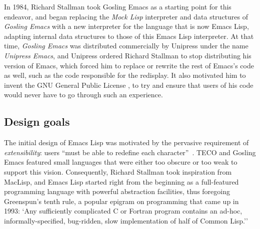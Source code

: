 \documentclass[format=acmsmall, review]{acmart}
\newcommand \Elisp {Emacs Lisp}
\begin{document}
In 1984, Richard Stallman took Gosling Emacs as a starting point for this
endeavor, and began replacing
the \emph{Mock Lisp} interpreter and data structures of \emph{Gosling Emacs}
with a new interpreter for the language that is now \Elisp{}, adapting
internal data structures to those of
this \Elisp{} interpreter.  At that time, \emph{Gosling Emacs} was distributed
commercially by Unipress under the name \emph{Unipress Emacs}, and Unipress
ordered Richard Stallman to stop distributing his version of Emacs, which
forced him to replace or rewrite the rest of Emacs's code as well, such as
the code responsible for the redisplay.  It also motivated him to invent the
GNU General Public License \cite{GPLHistory}, to try and ensure that users
of his code would never have to go through such an experience.

\subsection{Design goals}

The initial design of \Elisp{} was motivated by the pervasive requirement of
\emph{extensibility}: users ``must be able to redefine each
character''~\cite{Stallman1981}.  TECO and Gosling Emacs featured small
languages that were either too obscure or too weak to support this vision.
Consequently, Richard Stallman took inspiration from MacLisp, and \Elisp{}
started right from the beginning as a full-featured programming language with
powerful abstraction facilities, thus foregoing Greenspun's tenth
rule, a popular epigram on programming that came up in  1993: `Any
sufficiently complicated C or Fortran program contains an
ad-hoc, informally-specified, bug-ridden, slow implementation of half of
Common Lisp.''~\cite{GreenspunsRule}
\end{document}
